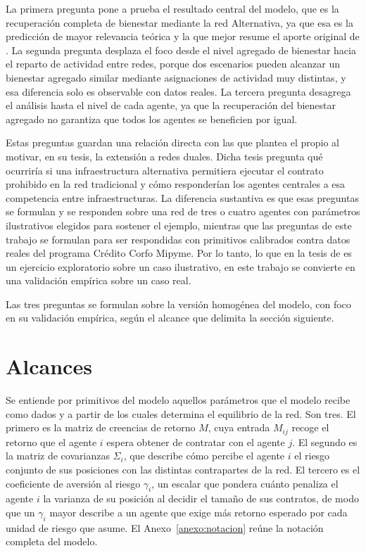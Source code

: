 La primera pregunta pone a prueba el resultado central del modelo, que es la recuperación completa de bienestar mediante la red Alternativa, ya que esa es la predicción de mayor relevancia teórica y la que mejor resume el aporte original de . La segunda pregunta desplaza el foco desde el nivel agregado de bienestar hacia el reparto de actividad entre redes, porque dos escenarios pueden alcanzar un bienestar agregado similar mediante asignaciones de actividad muy distintas, y esa diferencia solo es observable con datos reales. La tercera pregunta desagrega el análisis hasta el nivel de cada agente, ya que la recuperación del bienestar agregado no garantiza que todos los agentes se beneficien por igual.

Estas preguntas guardan una relación directa con las que plantea el propio  al motivar, en su tesis, la extensión a redes duales. Dicha tesis pregunta qué ocurriría si una infraestructura alternativa permitiera ejecutar el contrato prohibido en la red tradicional y cómo responderían los agentes centrales a esa competencia entre infraestructuras. La diferencia sustantiva es que esas preguntas se formulan y se responden sobre una red de tres o cuatro agentes con parámetros ilustrativos elegidos para sostener el ejemplo, mientras que las preguntas de este trabajo se formulan para ser respondidas con primitivos calibrados contra datos reales del programa Crédito Corfo Mipyme. Por lo tanto, lo que en la tesis de  es un ejercicio exploratorio sobre un caso ilustrativo, en este trabajo se convierte en una validación empírica sobre un caso real.

Las tres preguntas se formulan sobre la versión homogénea del modelo, con foco en su validación empírica, según el alcance que delimita la sección siguiente.

\section{Alcances}
\label{c1:alcances}

Se entiende por primitivos del modelo aquellos parámetros que el modelo recibe como dados y a partir de los cuales determina el equilibrio de la red. Son tres. El primero es la matriz de creencias de retorno $M$, cuya entrada $M_{ij}$ recoge el retorno que el agente $i$ espera obtener de contratar con el agente $j$. El segundo es la matriz de covarianzas $\Sigma_i$, que describe cómo percibe el agente $i$ el riesgo conjunto de sus posiciones con las distintas contrapartes de la red. El tercero es el coeficiente de aversión al riesgo $\gamma_i$, un escalar que pondera cuánto penaliza el agente $i$ la varianza de su posición al decidir el tamaño de sus contratos, de modo que un $\gamma_i$ mayor describe a un agente que exige más retorno esperado por cada unidad de riesgo que asume. El Anexo~\ref{anexo:notacion} reúne la notación completa del modelo.

